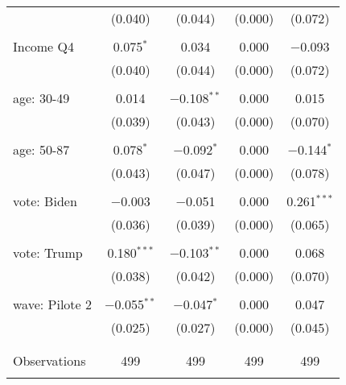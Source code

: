 \begin{tabular}{@{\extracolsep{5pt}}lcccc}
  & (0.040) & (0.044) & (0.000) & (0.072) \\ 
  & & & & \\ 
 Income Q4 & 0.075$^{*}$ & 0.034 & 0.000 & $-$0.093 \\ 
  & (0.040) & (0.044) & (0.000) & (0.072) \\ 
  & & & & \\ 
 age: 30-49 & 0.014 & $-$0.108$^{**}$ & 0.000 & 0.015 \\ 
  & (0.039) & (0.043) & (0.000) & (0.070) \\ 
  & & & & \\ 
 age: 50-87 & 0.078$^{*}$ & $-$0.092$^{*}$ & 0.000 & $-$0.144$^{*}$ \\ 
  & (0.043) & (0.047) & (0.000) & (0.078) \\ 
  & & & & \\ 
 vote: Biden & $-$0.003 & $-$0.051 & 0.000 & 0.261$^{***}$ \\ 
  & (0.036) & (0.039) & (0.000) & (0.065) \\ 
  & & & & \\ 
 vote: Trump & 0.180$^{***}$ & $-$0.103$^{**}$ & 0.000 & 0.068 \\ 
  & (0.038) & (0.042) & (0.000) & (0.070) \\ 
  & & & & \\ 
 wave: Pilote 2 & $-$0.055$^{**}$ & $-$0.047$^{*}$ & 0.000 & 0.047 \\ 
  & (0.025) & (0.027) & (0.000) & (0.045) \\ 
  & & & & \\ 
\hline \\[-1.8ex] 

Observations & 499 & 499 & 499 & 499 \\ 
\hline 
\hline \\[-1.8ex] 
\end{tabular} 